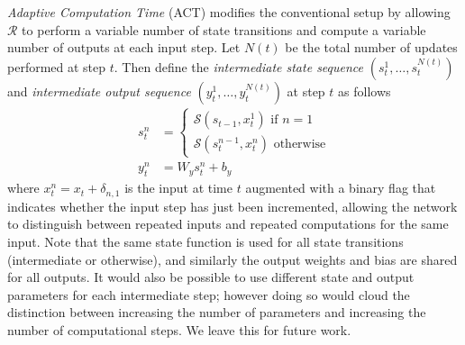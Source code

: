 \documentclass[10pt]{article}
\newcommand{\rnn}{\mathcal{R}}
\newcommand{\statef}{\mathcal{S}}
\newcommand{\elabel}[1]{\label{eq:#1}}
\begin{document}
\emph{Adaptive Computation Time} (ACT) modifies the conventional setup by allowing $\rnn$ to perform a variable number of state transitions and compute a variable number of outputs at each input step.
Let $N(t)$ be the total number of updates performed at step $t$.
Then define the \emph{intermediate state sequence} $(s^1_t,\ldots,s^{N(t)}_t)$ and \emph{intermediate output sequence} $(y^1_t,\ldots,y^{N(t)}_t)$ at step $t$ as follows
\begin{align}
\elabel{rnn_hidden}
s^n_t &= \begin{cases}\statef(s_{t-1}, x^1_t)\text{ if }n=1\\\statef(s^{n-1}_{t}, x^n_t)\text{ otherwise}\end{cases}\\
y^n_t &= W_y s^n_t + b_y
\end{align}
where $x^n_t = x_t + \delta_{n,1}$ is the input at time $t$ augmented with a binary flag that indicates whether the input step has just been incremented, allowing the network to distinguish between repeated inputs and repeated computations for the same input.
Note that the same state function is used for all state transitions (intermediate or otherwise), and similarly the output weights and bias are shared for all outputs.
It would also be possible to use different state and output parameters for each intermediate step; however doing so would cloud the distinction between increasing the number of parameters and increasing the number of computational steps.
We leave this for future work.
\end{document}
